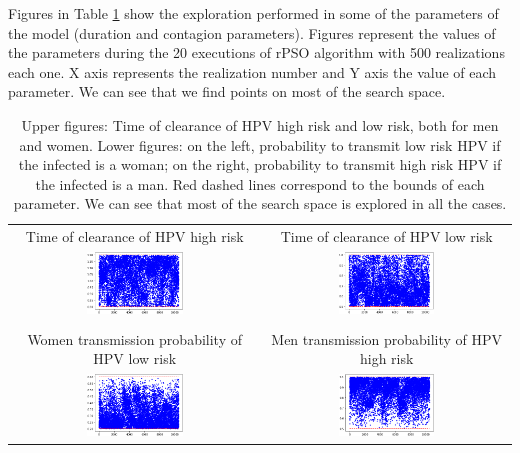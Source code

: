 Figures in Table \ref{Ctg} show the exploration performed in some of the parameters of the model (duration and contagion parameters). Figures represent the values of the parameters during the 20 executions of rPSO algorithm with 500 realizations each one. X axis represents the realization number and Y axis the value of each parameter. We can see that we find points on most of the search space.

\begin{table}[!h]
\begin{center}	
\begin{tabular}{cc}
	Time of clearance of HPV high risk & Time of clearance of HPV low risk \\
	\includegraphics[width=0.4\textwidth]{IMGs/1.-Calibrado/Dura_HR_H.png} & \includegraphics[width=0.4\textwidth]{IMGs/1.-Calibrado/Dura_LR_H.png} \\ 
	\\
	Women transmission probability of HPV low risk & Men transmission probability of HPV high risk \\
	\includegraphics[width=0.4\textwidth]{IMGs/1.-Calibrado/Ctg_M_LR.png} & \includegraphics[width=0.4\textwidth]{IMGs/1.-Calibrado/Ctg_H_HR.png}  
\end{tabular}
\caption{Upper figures: Time of clearance of HPV high risk and low risk, both for men and women. Lower figures: on the left, probability to transmit low risk HPV if the infected is a woman; on the right, probability to transmit high risk HPV if the infected is a man. Red dashed lines correspond to the bounds of each parameter. We can see that most of the search space is explored in all the cases.} 
\label{Ctg}
\end{center}
\end{table}

